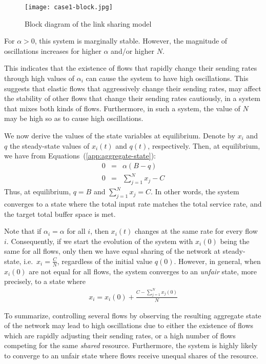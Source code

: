 \documentclass{article}
\begin{document}
\begin{figure}[htbp] %
   \centering
   \texttt{[image: case1-block.jpg]} 
   \caption{Block diagram of the link sharing model}
   \label{fig:case1-block}
\end{figure}

For $\alpha > 0$, this system is marginally stable.
However,  the magnitude of oscillations increases for higher $\alpha$ and/or higher $N$.

This indicates that 
the existence of flows that
rapidly change their sending rates
through high values of $\alpha_i$ 
can cause the system to have high oscillations.
This suggests that elastic flows
that aggressively change their sending rates,
may affect the stability of other flows that
change their sending rates cautiously,
in a system that mixes both kinds of flows.
Furthermore, in such a system,
the value of $N$ may be high so as 
to cause high oscillations.

We now derive the values of the state variables
at equilibrium.
Denote by $x_i$ and
$q$ the steady-state values
of $x_i(t)$ and $q(t)$, respectively.
Then, at equilibrium, we have from Equations~(\ref{app:aggregate-state}):
\begin{eqnarray*}
0 &=&  \alpha (B - q)  \nonumber \\ 
0 &=&  \sum_{j=1}^{N} x_j - C 
\end{eqnarray*}
Thus, at equilibrium, $q = B$ and $\sum_{j=1}^{N} x_j = C$.
In other words,
the system converges to a state where
the total input rate matches the total service rate,
and the target total buffer space is met.

Note that if 
$\alpha_i = \alpha$ for all $i$,
then $x_i(t)$ changes at the same rate
for every flow $i$.
Consequently, if we start the evolution of
the system with $x_i(0)$ being the same
for all flows,
only then we have equal sharing of the network
at steady-state, i.e.\ $x_i = \frac{C}{N}$,
regardless of the initial value $q(0)$.
However, in general,
when $x_i(0)$ are not equal
for all flows,
the system converges to an {\em unfair} state,
more precisely, to a state where
\begin{eqnarray*}
x_i = x_i(0) + \frac{C - \sum_{j=1}^{N} x_j(0)}{N}
\end{eqnarray*}

To summarize,
controlling several flows 
by observing the resulting aggregate state of
the network may lead to high oscillations 
due to either
the existence of flows which
are rapidly adjusting their sending rates,
or a high number of flows competing
for the same {\em shared} resource.
Furthermore, 
the system is highly likely to converge to
an unfair state where flows receive
unequal shares of the resource.
\end{document}
